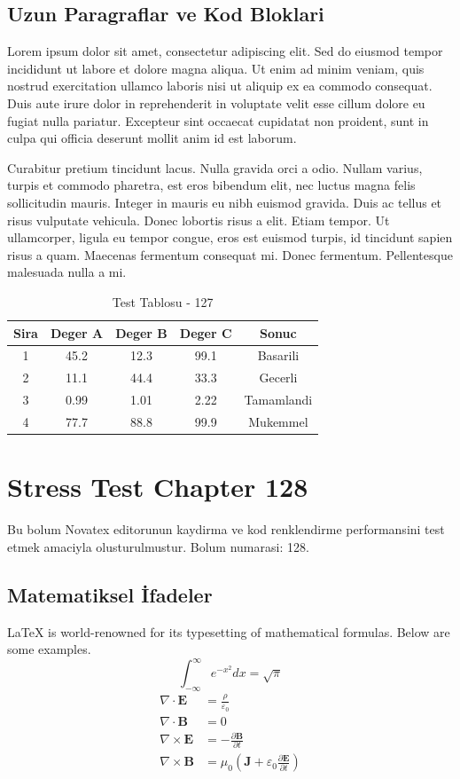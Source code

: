 \documentclass[12pt,a4paper]{article}
\begin{document}
\subsection{Uzun Paragraflar ve Kod Bloklari}
Lorem ipsum dolor sit amet, consectetur adipiscing elit. Sed do eiusmod tempor incididunt ut labore et dolore magna aliqua. Ut enim ad minim veniam, quis nostrud exercitation ullamco laboris nisi ut aliquip ex ea commodo consequat. Duis aute irure dolor in reprehenderit in voluptate velit esse cillum dolore eu fugiat nulla pariatur. Excepteur sint occaecat cupidatat non proident, sunt in culpa qui officia deserunt mollit anim id est laborum.

Curabitur pretium tincidunt lacus. Nulla gravida orci a odio. Nullam varius, turpis et commodo pharetra, est eros bibendum elit, nec luctus magna felis sollicitudin mauris. Integer in mauris eu nibh euismod gravida. Duis ac tellus et risus vulputate vehicula. Donec lobortis risus a elit. Etiam tempor. Ut ullamcorper, ligula eu tempor congue, eros est euismod turpis, id tincidunt sapien risus a quam. Maecenas fermentum consequat mi. Donec fermentum. Pellentesque malesuada nulla a mi.

\begin{table}[h!]
\centering
\begin{tabular}{|c|c|c|c|c|}
\hline
\textbf{Sira} & \textbf{Deger A} & \textbf{Deger B} & \textbf{Deger C} & \textbf{Sonuc} \\
\hline
1 & 45.2 & 12.3 & 99.1 & Basarili \\
2 & 11.1 & 44.4 & 33.3 & Gecerli \\
3 & 0.99 & 1.01 & 2.22 & Tamamlandi \\
4 & 77.7 & 88.8 & 99.9 & Mukemmel \\
\hline
\end{tabular}
\caption{Test Tablosu - 127}
\end{table}

\newpage
\section{Stress Test Chapter 128}
Bu bolum Novatex editorunun kaydirma ve kod renklendirme performansini test etmek amaciyla olusturulmustur. Bolum numarasi: 128.

\subsection{Matematiksel İfadeler}
\LaTeX{} is world-renowned for its typesetting of mathematical formulas. Below are some examples.
\begin{equation}
\int_{-\infty}^{\infty} e^{-x^2} dx = \sqrt{\pi}
\end{equation}
\begin{align}
\nabla \cdot \mathbf{E} &= \frac{\rho}{\varepsilon_0} \\
\nabla \cdot \mathbf{B} &= 0 \\
\nabla \times \mathbf{E} &= -\frac{\partial \mathbf{B}}{\partial t} \\
\nabla \times \mathbf{B} &= \mu_0\left(\mathbf{J} + \varepsilon_0 \frac{\partial \mathbf{E}}{\partial t}\right)
\end{align}
\end{document}
